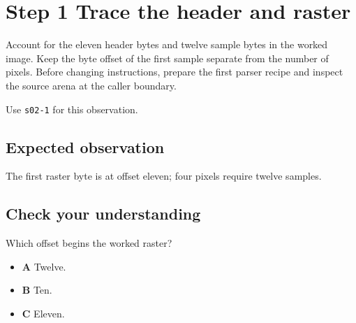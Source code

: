 \section{Step 1 Trace the header and raster}\label{ppm-s01}

Account for the eleven header bytes and twelve sample bytes in the worked image. Keep the byte offset of the first sample separate from the number of pixels. Before changing instructions, prepare the first parser recipe and inspect the source arena at the caller boundary.

Use \texttt{s02-1} for this observation.

\subsection{Expected observation}
The first raster byte is at offset eleven; four pixels require twelve samples.

\subsection{Check your understanding}
Which offset begins the worked raster?

\begin{itemize}
  \item \textbf{A} Twelve.
  \item \textbf{B} Ten.
  \item \textbf{C} Eleven.
\end{itemize}
